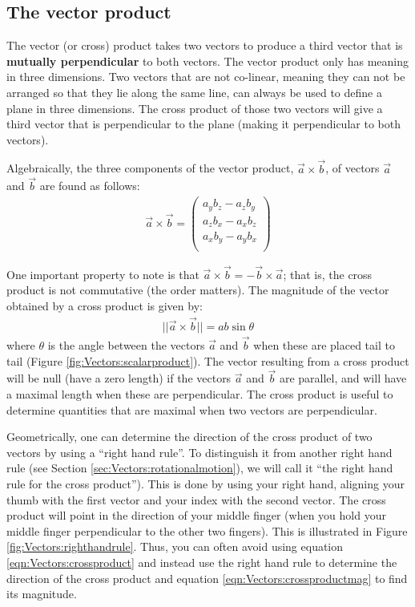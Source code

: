 \subsection{The vector product}
\label{sec:Vectors:vectorproduct}
The vector (or cross) product takes two vectors to produce a third vector that is \textbf{mutually perpendicular} to both vectors. The vector product only has meaning in three dimensions. Two vectors that are not co-linear, meaning they can not be arranged so that they lie along the same line, can always be used to define a plane in three dimensions. The cross product of those two vectors will give a third vector that is perpendicular to the plane (making it perpendicular to both vectors). 

Algebraically, the three components of the vector product, $\vec a\times \vec b$, of vectors $\vec a$ and $\vec b$ are found as follows:
\begin{align}
\label{eqn:Vectors:crossproduct}
\vec a \times \vec b =\begin{pmatrix}
           a_yb_z - a_z b_y\\
           a_zb_x - a_x b_z\\
           a_xb_y - a_y b_x\\
         \end{pmatrix}
\end{align}

One important property to note is that $\vec a \times \vec b = -\vec b \times \vec a$; that is, the cross product is not commutative (the order matters). The magnitude of the vector obtained by a cross product is given by:
\begin{align}
\label{eqn:Vectors:crossproductmag}
||\vec a \times \vec b ||=ab\sin\theta
\end{align}
where $\theta$ is the angle between the vectors $\vec a$ and $\vec b$ when these are placed tail to tail (Figure \ref{fig:Vectors:scalarproduct}). The vector resulting from a cross product will be null (have a zero length) if the vectors $\vec a$ and $\vec b$ are parallel, and will have a maximal length when these are perpendicular. The cross product is useful to determine quantities that are maximal when two vectors are perpendicular. 

Geometrically, one can determine the direction of the cross product of two vectors by using a ``right hand rule''. To distinguish it from another right hand rule (see Section \ref{sec:Vectors:rotationalmotion}), we will call it ``the right hand rule for the cross product''). This is done by using your right hand, aligning your thumb with the first vector and your index with the second vector. The cross product will point in the direction of your middle finger (when you hold your middle finger perpendicular to the other two fingers). This is illustrated in Figure \ref{fig:Vectors:righthandrule}. Thus, you can often avoid using equation \ref{eqn:Vectors:crossproduct} and instead use the right hand rule to determine the direction of the cross product and equation \ref{eqn:Vectors:crossproductmag} to find its magnitude.

